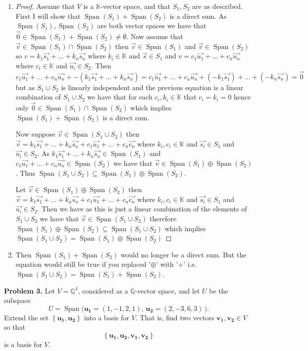 \documentclass[letter,12pt]{article}
\newcommand{\K}{\mathbb{K}}
\newcommand{\Q}{\mathbb{Q}}
\newcommand{\Span}{\operatorname{Span}}
\begin{document}
\begin{enumerate}[label=(\alph*)]
\item
\begin{proof}
    Assume that $V$ is a $\mathbb{K}$-vector space, and that $S_1,S_2$ are as described.
    First I will show that $\Span(S_1)+\Span(S_2)$ is a direct sum. As $\Span(S_1),\Span(S_2)$ are both vector spaces we have that $\vec{0}\in \Span(S_1)+\Span(S_2)\not = \emptyset$. Now assume that $\vec{v}\in \Span(S_1)\cap \Span(S_2)$ then $\vec{v}\in \Span(S_1)$ and $\vec{v}\in \Span(S_2)$ so $v=k_1\vec{s_1}+...+k_n\vec{s_n}$ where $k_i\in \K$ and $\vec{s}\in S_1$ and $v= c_1\vec{u_1}+...+c_n\vec{u_n}$ where $c_i\in \K$ and $\vec{u_i}\in S_2$. Then $c_1\vec{u_1}+...+c_n\vec{u_n}+-(k_1\vec{s_1}+...+k_n\vec{s_n})=c_1\vec{u_1}+...+c_n\vec{u_n}+(-k_1\vec{s_1})+...+(-k_n\vec{s_n})=\vec{0}$ but as $S_1\cup S_2$ is linearly independent and the previous equation is a linear combination of $S_1\cup S_2$ we have that for each $c_i,k_i\in \K$ that $c_i=k_i=0$ hence only $\vec{0}\in \Span(S_1)\cap \Span(S_2)$ which implies $\Span(S_1)+ \Span(S_2)$ is a direct sum. 
    
    Now suppose $\vec{v}\in \Span(S_1\cup S_2)$ then $\vec{v}= k_1\vec{s_1}+...+k_n\vec{s_n}+c_1\vec{u_1}+...+c_n\vec{c_n}$ where $k_i ,c_i\in \K$ and $\vec{s_i} \in S_1$ and $\vec{u_i}\in S_2$. As $k_1\vec{s_1}+...+k_n\vec{s_n}\in \Span(S_1)$ and $c_1\vec{u_1}+...+c_n\vec{u_n}\in \Span(S_2)$ we have that $\vec{v}\in \Span(S_1)\oplus \Span(S_2)$. Thus $\Span(S_1\cup S_2)\subseteq \Span(S_1) \oplus \Span(S_2)$. 
    
    Let $\vec{v}\in \Span(S_1)\oplus \Span(S_2)$ then $\vec{v}= k_1\vec{s_1}+...+k_n\vec{s_n}+c_1\vec{u_1}+...+c_n\vec{c_n}$ where $k_i ,c_i\in \K$ and $\vec{s_i} \in S_1$ and $\vec{u_i}\in S_2$. Then we have as this is just a linear combination of the elements of $S_1\cup S_2$ we have that $\vec{v}\in \Span(S_1 \cup S_2)$ therefore $\Span(S_1) \oplus \Span(S_2)\subseteq \Span(S_1 \cup S_2)$ which implies $\Span(S_1 \cup S_2)= \Span(S_1) \oplus \Span(S_2)$
\end{proof}
\item Then $\Span(S_1)+\Span(S_2)$ would no longer be a direct sum. But the equation would still be true if you replaced '$\oplus$' with '$+$' i.e. $\Span(S_1 \cup S_2) = \Span(S_1) + \Span(S_2)$.
\end{enumerate}
\newpage
\begin{tcolorbox}
\textbf{Problem 3.} Let $V = \Q^4$, considered as a $\Q$-vector space, and let
$U$ be the subspace
$$U = \Span\!\big(\mathbf{u_1}=(1,-1,2,1),\,\mathbf{u_2}=(2,-3,6,3)\,\big).$$
Extend the set $\left\{\mathbf{u_1},\mathbf{u_2}\right\}$ into a basis for $V$.
That is, find two vectors $\mathbf{v_1},\mathbf{v_2} \in V$ so that
$$\left\{\mathbf{u_1},\mathbf{u_2},\mathbf{v_1},\mathbf{v_2}\right\}$$
is a basis for $V$.
\end{tcolorbox}
\end{document}
